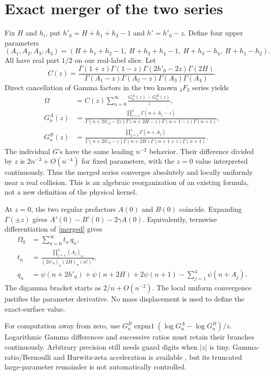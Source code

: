 \documentclass[11pt,a4paper]{article}
\newcommand{\Om}{\Omega}
\begin{document}
\section{Exact merger of the two series}
Fix $H$ and $h_i$, put $h'_0=H+h_1+h_3-1$ and $h'=h'_0-z$.
Define four upper parameters
\[
 (A_1,A_2,A_3,A_4)=
 (H+h_1+h_2-1,\ H+h_3+h_4-1,\ H+h_3-h_4,\ H+h_1-h_2).
\]
All have real part $1/2$ on our real-label slice.
Let
\[
 C(z)=\frac{\Gamma(1+z)\Gamma(1-z)\Gamma(2h'_0-2z)\Gamma(2H)}
 {\Gamma(A_1-z)\Gamma(A_2-z)\Gamma(A_3)\Gamma(A_4)} .
\]
Direct cancellation of Gamma factors in the two known $\!{}_4F_3$
series yields
\begin{align}
 \Om&=C(z)\sum_{n=0}^{\infty}\frac{G_n^A(z)-G_n^B(z)}{z},\label{merged}\\
 G_n^A(z)&=
 \frac{\prod_{j=1}^4\Gamma(n+A_j-z)}
 {\Gamma(n+2h'_0-2z)\Gamma(n+2H-z)
  \Gamma(n+1-z)\Gamma(n+1)},\\
 G_n^B(z)&=
 \frac{\prod_{j=1}^4\Gamma(n+A_j)}
 {\Gamma(n+2h'_0-z)\Gamma(n+2H)
  \Gamma(n+1+z)\Gamma(n+1)}.
\end{align}
The individual $G$'s have the same leading $n^{-2}$ behavior.
Their difference divided by $z$ is $2n^{-3}+O(n^{-4})$ for
fixed parameters, with the $z=0$ value interpreted continuously.
Thus the merged series converges absolutely and locally uniformly
near a real collision. This is an algebraic reorganization of an
existing formula, not a new definition of the physical kernel.

At $z=0$, the two regular prefactors $A(0)$ and $B(0)$ coincide.
Expanding $\Gamma(\pm z)$ gives
$A'(0)-B'(0)-2\gamma A(0)$.
Equivalently, termwise differentiation of \eqref{merged} gives
\begin{align}
 \Om_0&=\sum_{n=0}^{\infty}t_n\,q_n,\label{digamma}\\
 t_n&=\frac{\prod_{j=1}^4(A_j)_n}
 {(2h'_0)_n(2H)_n(n!)^2},\\
 q_n&=\psi(n+2h'_0)+\psi(n+2H)+2\psi(n+1)
       -\sum_{j=1}^4\psi(n+A_j).
\end{align}
The digamma bracket starts as $2/n+O(n^{-2})$.
The local uniform convergence justifies the parameter derivative.
No mass displacement is used to define the exact-surface value.

For computation away from zero, use
$G_n^B\operatorname{expm1}(\log G_n^A-\log G_n^B)/z$.
Logarithmic Gamma differences and successive ratios must retain their
branches continuously. Arbitrary precision still needs guard digits
when $|z|$ is tiny. Gamma-ratio/Bernoulli and Hurwitz-zeta acceleration
is available \cite{dlmf}, but its truncated large-parameter remainder
is not automatically controlled.
\end{document}
